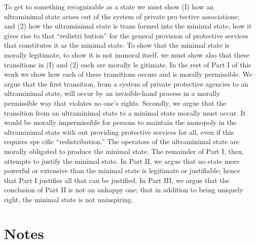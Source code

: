 \documentclass[11pt,openany]{book}
\newcommand{\booknoteshead}{%
  \phantomsection\section*{Notes}%
  \addcontentsline{toc}{section}{Notes}\markright{Notes}}
\begin{document}
To get to something recognizable as a state we must show (I) how an ultraminimal state arises out of the system of private pro tective associations; and (2) how the ultraminimal state is trans formed into the minimal state, how it gives rise to that ``redistri bution'' for the general provision of protective services that constitutes it as the minimal state. To show that the minimal state is morally legitimate, to show it is not immoral itself, we must show also that these transitions in (I) and (2) each are morally le gitimate. In the rest of Part I of this work we show how each of these transitions occurs and is morally permissible. We argue that the first transition, from a system of private protective agencies to an ultraminimal state, will occur by an invisible-hand process in a morally permissible way that violates no one's rights. Secondly, we argue that the transition from an ultraminimal state to a minimal state morally must occur. It would be morally impermissible for persons to maintain the monopoly in the ultraminimal state with out providing protective services for all, even if this requires spe cific ``redistribution.'' The operators of the ultraminimal state are morally obligated to produce the minimal state. The remainder of Part I, then, attempts to justify the minimal state. In Part II, we argue that no state more powerful or extensive than the minimal state is legitimate or justifiable; hence that Part I justifies all that can be justified. In Part III, we argue that the conclusion of Part II is not an unhappy one; that in addition to being uniquely right, the minimal state is not uninspiring. 

\booknoteshead
\end{document}
